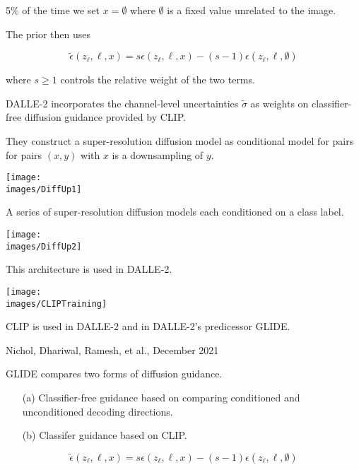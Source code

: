 {5\% of the time we set $x = \emptyset$ where $\emptyset$ is a fixed value unrelated to the image.

\vfill
The prior then uses

$$\tilde{\epsilon}(z_\ell,\ell,x) = s\epsilon(z_\ell,\ell,x) - (s-1)\epsilon(z_\ell,\ell,\emptyset)$$

\vfill
where $s \geq 1$ controls the relative weight of the two terms.

\vfill
DALLE-2 incorporates the channel-level uncertainties $\tilde{\sigma}$ as weights on classifier-free diffusion guidance provided by CLIP.


They construct a super-resolution diffusion model as conditional model for pairs for pairs $(x,y)$ with $x$ is a downsampling of $y$.

\vfill
\centerline{\texttt{[image: \\images/DiffUp1]}}


A series of super-resolution diffusion models each conditioned on a class label.

\centerline{\texttt{[image: \\images/DiffUp2]}}

\vfill
This architecture is used in DALLE-2.


\centerline{\texttt{[image: \\images/CLIPTraining]}}

\vfill
CLIP is used in DALLE-2 and in DALLE-2's predicessor GLIDE.

         {Nichol, Dhariwal, Ramesh, et al., December 2021}

GLIDE compares two forms of diffusion guidance.

\vfill
\begin{itemize}
\item[(a)] Classifier-free guidance based on comparing conditioned and unconditioned decoding directions.

\vfill
\item[(b)] Classifer guidance based on CLIP.
\end{itemize}


$$\tilde{\epsilon}(z_\ell,\ell,x) = s\epsilon(z_\ell,\ell,x) - (s-1)\epsilon(z_\ell,\ell,\emptyset)$$

}
